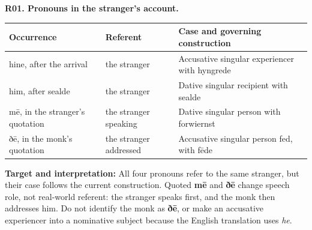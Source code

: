 \par\begin{minipage}{\linewidth}\raggedright
\textbf{R01. Pronouns in the stranger’s account.}

\par\begingroup
\fontsize{10.5}{13.2}\selectfont
\setlength{\LTleft}{0pt}\setlength{\LTright}{\fill}
\noindent
\begin{tabular}{@{}>{\raggedright\arraybackslash}p{37.65mm}>{\raggedright\arraybackslash}p{28.75mm}>{\raggedright\arraybackslash}p{51.98mm}@{}}
\toprule
\textbf{Occurrence} & \textbf{Referent} & \textbf{Case and governing construction} \\
\midrule
hine, after the arrival & the stranger & Accusative singular experiencer with hyngrede \\
him, after sealde & the stranger & Dative singular recipient with sealde \\
mē, in the stranger’s quotation & the stranger speaking & Dative singular person with forwiernst \\
ðē, in the monk’s quotation & the stranger addressed & Accusative singular person fed, with fēde \\
\bottomrule
\end{tabular}
\par\endgroup

\textbf{Target and interpretation:} All four pronouns refer to the same stranger, but their case follows the current construction. Quoted \textbf{mē} and \textbf{ðē} change speech role, not real-world referent: the stranger speaks first, and the monk then addresses him. Do not identify the monk as \textbf{ðē}, or make an accusative experiencer into a nominative subject because the English translation uses \emph{he}.

\end{minipage}\par\addvspace{4pt}

